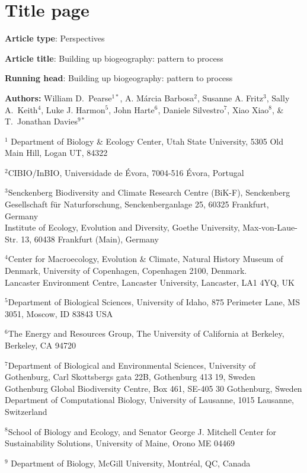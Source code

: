 \documentclass[12pt,english]{article}
\begin{document}
\setlength{\parindent}{0pt}
\section*{Title page}
\textbf{Article type}: Perspectives

\textbf{Article title}: Building up biogeography: pattern to process

\textbf{Running head}: Building up biogeography: pattern to process

\textbf{Authors:} William D.\ Pearse$^{1*}$, A. M\'{a}rcia
Barbosa$^2$, Susanne A. Fritz$^3$, Sally A.\ Keith$^4$, Luke J.
Harmon$^5$, John Harte$^6$, Daniele Silvestro$^7$, Xiao Xiao$^8$, \&
T.\ Jonathan Davies$^{9*}$\

$^1$ Department of Biology \& Ecology Center, Utah State University,
5305 Old Main Hill, Logan UT, 84322

$^2$CIBIO/InBIO, Universidade de \'{E}vora, 7004-516 \'{E}vora,
Portugal

$^3$Senckenberg Biodiversity and Climate Research Centre (BiK-F),
Senckenberg Gesellschaft f\"{u}r Naturforschung, Senckenberganlage 25,
60325 Frankfurt, Germany \\Institute of Ecology, Evolution and
Diversity, Goethe University, Max-von-Laue-Str. 13, 60438 Frankfurt
(Main), Germany

$^4$Center for Macroecology, Evolution \& Climate, Natural History
Museum of Denmark, University of Copenhagen, Copenhagen 2100, Denmark.
\\Lancaster Environment Centre, Lancaster University, Lancaster, LA1
4YQ, UK

$^5$Department of Biological Sciences, University of Idaho, 875
Perimeter Lane, MS 3051, Moscow, ID 83843 USA

$^6$The Energy and Resources Group, The University of California at
Berkeley, Berkeley, CA 94720

$^7$Department of Biological and Environmental Sciences, University of
Gothenburg, Carl Skottsbergs gata 22B, Gothenburg 413 19, Sweden
\\Gothenburg Global Biodiversity Centre, Box 461, SE-405 30
Gothenburg, Sweden \\Department of Computational Biology, University
of Lausanne, 1015 Lausanne, Switzerland

$^8$School of Biology and Ecology, and Senator George J. Mitchell
Center for Sustainability Solutions, University of Maine, Orono ME
04469

$^9$ Department of Biology, McGill University, Montr\'{e}al, QC,
Canada
\end{document}

